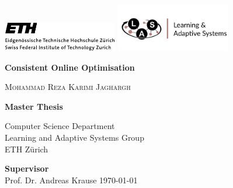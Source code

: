 \begin{titlepage}
    \begin{center}
        \includegraphics[width=5cm]{figures/eth-logo}\hfill
        \includegraphics[width=5cm]{figures/las-logo}
        \vspace{4cm}

        {\Huge
            \textbf{Consistent Online Optimisation}
        }
        
        \vspace{2cm}
        {\large
            \textsc{Mohammad Reza Karimi Jaghargh}
        }

        \vspace{2cm}
        {\large
            \textbf{Master Thesis}\\
        }
        
        \vspace{.5cm}
        Computer Science Department\\
        Learning and Adaptive Systems Group\\
        ETH Z\"urich
        
        \vspace{2cm}
        {\large
            \textbf{Supervisor}\\[.5cm]
            Prof. Dr. Andreas Krause
        }
        \vfill
        \today
        
    \end{center}
\end{titlepage}
